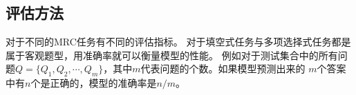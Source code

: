 
\subsection{评估方法}
对于不同的MRC任务有不同的评估指标。
对于填空式任务与多项选择式任务都是属于客观题型，用准确率就可以衡量模型的性能。
例如对于测试集合中的所有问题$Q=\{Q_1,$$Q_2,\cdots,Q_m\}$，其中$m$代表问题的个数。如果模型预测出来的
$m$个答案中有$n$个是正确的，模型的准确率是$n/m$。

